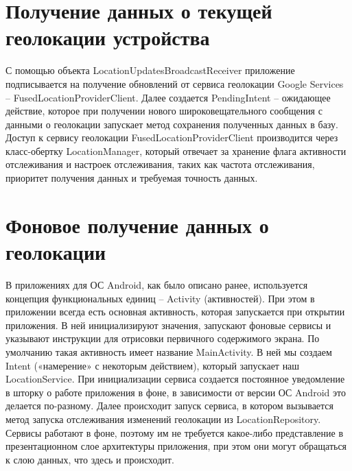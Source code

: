 \section{Получение данных о текущей геолокации устройства}
С помощью объекта LocationUpdatesBroadcastReceiver приложение подписывается на получение обновлений от сервиса геолокации Google Services – FusedLocationProviderClient.
Далее создается PendingIntent – ожидающее действие, которое при получении нового широковещательного сообщения с данными о геолокации запускает метод сохранения полученных данных в базу.
Доступ к сервису геолокации FusedLocationProviderClient производится через класс-обертку LocationManager, который отвечает за хранение флага активности отслеживания и настроек отслеживания, таких как частота отслеживания, приоритет получения данных и требуемая точность данных.

\section{Фоновое получение данных о геолокации}
В приложениях для ОС Android, как было описано ранее, используется концепция функциональных единиц – Activity (активностей). При этом в приложении всегда есть основная активность, которая запускается при открытии приложения. В ней инициализируют значения, запускают фоновые сервисы и указывают инструкции для отрисовки первичного содержимого экрана.
По умолчанию такая активность имеет название MainActivity. В ней мы создаем Intent («намерение» с некоторым действием), который запускает наш LocationService. 
При инициализации сервиса создается постоянное уведомление в шторку о работе приложения в фоне, в зависимости от версии ОС Android это делается по-разному.
Далее происходит запуск сервиса, в котором вызывается метод запуска отслеживания изменений геолокации из LocationRepository. Сервисы работают в фоне, поэтому им не требуется какое-либо представление в презентационном слое архитектуры приложения, при этом они могут обращаться к слою данных, что здесь и происходит.

